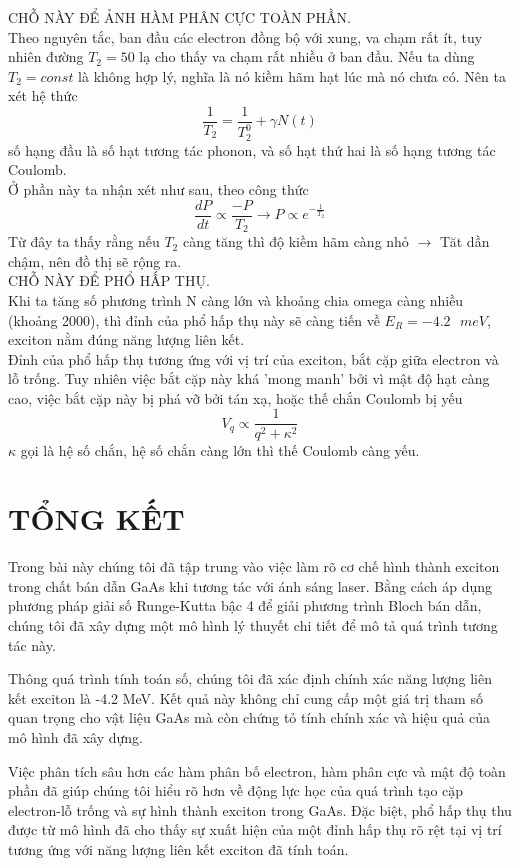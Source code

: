 \documentclass[%
 reprint,
 amsmath,amssymb,
 aps,
]{revtex4-2}
\begin{document}
CHỖ NÀY ĐỂ ẢNH HÀM PHÂN CỰC TOÀN PHẦN.\\

Theo nguyên tắc, ban đầu các electron đồng bộ với xung, va chạm rất ít, tuy nhiên đường $T_2 = 50$ lạ cho thấy va chạm rất nhiều ở ban đầu. Nếu ta dùng $T_2=const$ là không hợp lý, nghĩa là nó kiềm hãm hạt lúc mà nó chưa có. Nên ta xét hệ thức
\[
\frac{1}{T_2} = \frac{1}{T_2^0} + \gamma N(t)
\]
số hạng đầu là số hạt tương tác phonon, và số hạt thứ hai là số hạng tương tác Coulomb.\\
Ở phần này ta nhận xét như sau, theo công thức 
\[
\frac{dP}{dt} \propto \frac{-P}{T_2} \rightarrow P \propto e^{-\frac{1}{T_2}}
\]
Từ đây ta thấy rằng nếu $T_2$ càng tăng thì độ kiềm hãm càng nhỏ $\rightarrow$ Tăt dần chậm, nên đồ thị sẽ rộng ra. \\

CHỖ NÀY ĐỂ PHỔ HẤP THỤ.\\

Khi ta tăng số phương trình N càng lớn và khoảng chia omega càng nhiều (khoảng 2000), thì đỉnh của phổ hấp thụ này sẽ càng tiến về $E_R = -4.2 \text{ }meV$, exciton nằm đúng năng lượng liên kết.\\
Đỉnh của phổ hấp thụ tương ứng với vị trí của exciton, bắt cặp giữa electron và lỗ trống. Tuy nhiên việc bắt cặp này khá 'mong manh' bởi vì mật độ hạt càng cao, việc bắt cặp này bị phá vỡ bởi tán xạ, hoặc thế chắn Coulomb bị yếu 
\[
V_q \propto \frac{1}{q^2 + \kappa^2}
\]
$\kappa$ gọi là hệ số chắn, hệ số chắn càng lớn thì thế Coulomb càng yếu.
\section{\label{sec:level4} TỔNG KẾT}
Trong bài này chúng tôi đã tập trung vào việc làm rõ cơ chế hình thành exciton trong chất bán dẫn GaAs khi tương tác với ánh sáng laser. Bằng cách áp dụng phương pháp giải số Runge-Kutta bậc 4 để giải phương trình Bloch bán dẫn, chúng tôi đã xây dựng một mô hình lý thuyết chi tiết để mô tả quá trình tương tác này.

Thông quá trình tính toán số, chúng tôi đã xác định chính xác năng lượng liên kết exciton là -4.2 MeV. Kết quả này không chỉ cung cấp một giá trị tham số quan trọng cho vật liệu GaAs mà còn chứng tỏ tính chính xác và hiệu quả của mô hình đã xây dựng.

Việc phân tích sâu hơn các hàm phân bố electron, hàm phân cực và mật độ toàn phần đã giúp chúng tôi hiểu rõ hơn về động lực học của quá trình tạo cặp electron-lỗ trống và sự hình thành exciton trong GaAs. Đặc biệt, phổ hấp thụ thu được từ mô hình đã cho thấy sự xuất hiện của một đỉnh hấp thụ rõ rệt tại vị trí tương ứng với năng lượng liên kết exciton đã tính toán.
\end{document}
